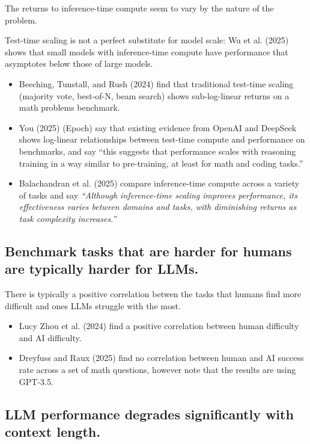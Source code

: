 \documentclass[
  letterpaper,
  DIV=11,
  numbers=noendperiod,
  oneside]{scrartcl}
\providecommand{\tightlist}{%
  \setlength{\itemsep}{0pt}\setlength{\parskip}{0pt}}
\begin{document}
The returns to inference-time compute seem to vary by the nature of the
problem.

Test-time scaling is not a perfect substitute for model scale: Wu et al.
(2025) shows that small models with inference-time compute have
performance that asymptotes below those of large models.

\begin{itemize}
\tightlist
\item
  Beeching, Tunstall, and Rush (2024) find that traditional test-time
  scaling (majority vote, best-of-N, beam search) shows sub-log-linear
  returns on a math problems benchmark.
\item
  You (2025) (Epoch) say that existing evidence from OpenAI and DeepSeek
  shows log-linear relationships between test-time compute and
  performance on benchmarks, and say ``this suggests that performance
  scales with reasoning training in a way similar to pre-training, at
  least for math and coding tasks.''
\item
  Balachandran et al. (2025) compare inference-time compute across a
  variety of tasks and say \emph{``Although inference-time scaling
  improves performance, its effectiveness varies between domains and
  tasks, with diminishing returns as task complexity increases.''}
\end{itemize}

\subsection{Benchmark tasks that are harder for humans are typically
harder for
LLMs.}\label{benchmark-tasks-that-are-harder-for-humans-are-typically-harder-for-llms.}

There is typically a positive correlation betwen the tasks that humans
find more difficult and ones LLMs struggle with the most.

\begin{itemize}
\tightlist
\item
  Lucy Zhou et al. (2024) find a positive correlation between human
  difficulty and AI difficulty.
\item
  Dreyfuss and Raux (2025) find no correlation between human and AI
  success rate across a set of math questions, however note that the
  results are using GPT-3.5.
\end{itemize}

\subsection{LLM performance degrades significantly with context
length.}\label{llm-performance-degrades-significantly-with-context-length.}
\end{document}
